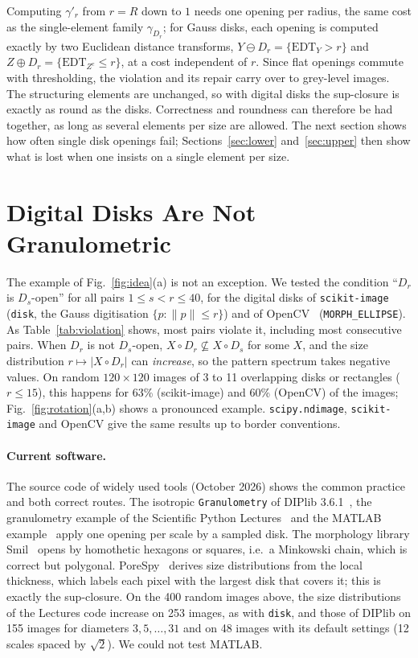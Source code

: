 \documentclass[runningheads]{llncs}
\begin{document}
Computing $\gamma'_r$ from $r=R$ down to $1$ needs one opening per radius, the same cost as the single-element family $\gamma_{D_r}$; for Gauss disks, each opening is computed exactly by two Euclidean distance transforms, $Y\ominus D_r=\{\mathrm{EDT}_Y>r\}$ and $Z\oplus D_r=\{\mathrm{EDT}_{Z^c}\le r\}$, at a cost independent of $r$. Since flat openings commute with thresholding, the violation and its repair carry over to grey-level images. The structuring elements are unchanged, so with digital disks the sup-closure is exactly as round as the disks. Correctness and roundness can therefore be had together, as long as several elements per size are allowed. The next section shows how often single disk openings fail; Sections~\ref{sec:lower} and~\ref{sec:upper} then show what is lost when one insists on a single element per size.

\section{Digital Disks Are Not Granulometric}\label{sec:violation}

The example of Fig.~\ref{fig:idea}(a) is not an exception. We tested the condition ``$D_r$ is $D_s$-open'' for all pairs $1\le s<r\le40$, for the digital disks of \texttt{scikit-image}~\cite{vanderwalt2014} (\texttt{disk}, the Gauss digitisation $\{p:\|p\|\le r\}$) and of OpenCV~\cite{bradski2000} (\texttt{MORPH\_ELLIPSE}). As Table~\ref{tab:violation} shows, most pairs violate it, including most consecutive pairs. When $D_r$ is not $D_s$-open, $X\circ D_r\not\subseteq X\circ D_s$ for some $X$, and the size distribution $r\mapsto|X\circ D_r|$ can \emph{increase}, so the pattern spectrum takes negative values. On random $120\times120$ images of 3 to 11 overlapping disks or rectangles ($r\le15$), this happens for 63\% (scikit-image) and 60\% (OpenCV) of the images; Fig.~\ref{fig:rotation}(a,b) shows a pronounced example. \texttt{scipy.ndimage}, \texttt{scikit-image} and OpenCV give the same results up to border conventions.

\paragraph{Current software.} The source code of widely used tools (October 2026) shows the common practice and both correct routes. The isotropic \texttt{Granulometry} of DIPlib 3.6.1~\cite{diplib}, the granulometry example of the Scientific Python Lectures~\cite{scipylectures} and the MATLAB example~\cite{matlabsnow} apply one opening per scale by a sampled disk. The morphology library Smil~\cite{smil} opens by homothetic hexagons or squares, i.e.\ a Minkowski chain, which is correct but polygonal. PoreSpy~\cite{gostick2019} derives size distributions from the local thickness, which labels each pixel with the largest disk that covers it; this is exactly the sup-closure. On the 400 random images above, the size distributions of the Lectures code increase on 253 images, as with \texttt{disk}, and those of DIPlib on 155 images for diameters $3,5,\dots,31$ and on 48 images with its default settings (12 scales spaced by $\sqrt2$). We could not test MATLAB.
\end{document}
